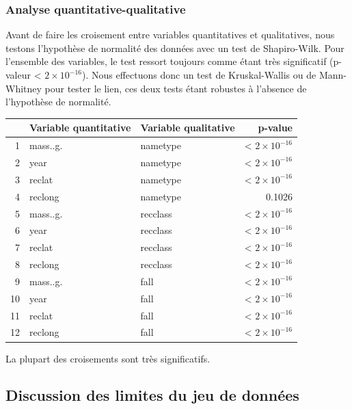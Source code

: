 \documentclass[12pt]{article}
\begin{document}
\subsubsection*{Analyse quantitative-qualitative}
Avant de faire les croisement entre variables quantitatives et qualitatives, nous testons l'hypothèse de normalité des données avec un test de Shapiro-Wilk. Pour l'ensemble des variables, le test ressort toujours comme étant très significatif (p-valeur < $2\times 10^{-16}$). Nous effectuons donc un test de Kruskal-Wallis ou de Mann-Whitney pour tester le lien, ces deux tests étant  robustes à l'absence de l'hypothèse de normalité.
\begin{table}[H]
\centering
\begin{tabular}{rllr}
  \hline
 & Variable quantitative & Variable qualitative & p-value \\ 
  \hline
1 & mass..g. & nametype & < $2\times 10^{-16}$ \\ 
  2 & year & nametype &< $2\times 10^{-16}$  \\ 
  3 & reclat & nametype &< $2\times 10^{-16}$ \\ 
  4 & reclong & nametype & 0.1026 \\ 
  5 & mass..g. & recclass & < $2\times 10^{-16}$  \\ 
  6 & year & recclass & < $2\times 10^{-16}$  \\ 
  7 & reclat & recclass & < $2\times 10^{-16}$  \\ 
  8 & reclong & recclass & < $2\times 10^{-16}$  \\ 
  9 & mass..g. & fall &< $2\times 10^{-16}$  \\ 
  10 & year & fall & < $2\times 10^{-16}$  \\ 
  11 & reclat & fall &< $2\times 10^{-16}$  \\ 
  12 & reclong & fall &< $2\times 10^{-16}$  \\ 
   \hline
\end{tabular}
\end{table}
La plupart des croisements sont très significatifs.
\subsection{Discussion des limites du jeu de données}
\end{document}
